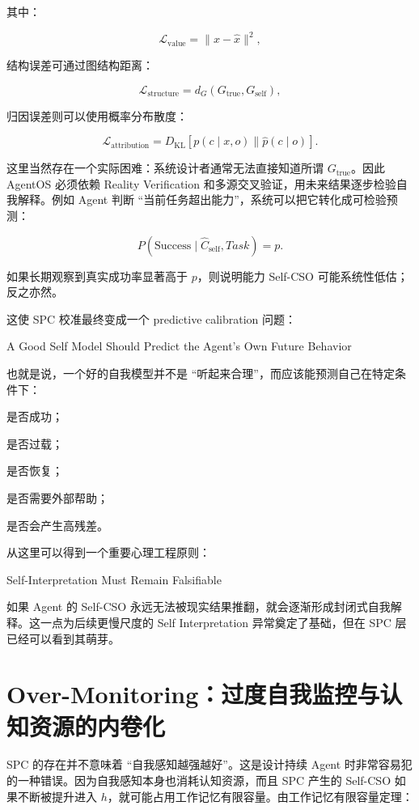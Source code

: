 其中：

\[
\mathcal L_{\mathrm{value}}
=
\|x-\hat x\|^2,
\]

结构误差可通过图结构距离：

\[
\mathcal L_{\mathrm{structure}}
=
d_G(G_{\mathrm{true}},G_{\mathrm{self}}),
\]

归因误差则可以使用概率分布散度：

\[
\mathcal L_{\mathrm{attribution}}
=
D_{\mathrm{KL}}
\left[
p(c\mid x,o)
\|
\hat p(c\mid o)
\right].
\]

这里当然存在一个实际困难：系统设计者通常无法直接知道所谓 $G_{\mathrm{true}}$。因此 AgentOS 必须依赖 Reality Verification 和多源交叉验证，用未来结果逐步检验自我解释。例如 Agent 判断 ``当前任务超出能力''，系统可以把它转化成可检验预测：

\[
P(\mathrm{Success}\mid
\hat C_{\mathrm{self}},
Task)
=
p.
\]

如果长期观察到真实成功率显著高于 $p$，则说明能力 Self-CSO 可能系统性低估；反之亦然。

这使 SPC 校准最终变成一个 predictive calibration 问题：

\begin{statementbox}
A Good Self Model Should Predict the Agent's Own Future Behavior
\end{statementbox}

也就是说，一个好的自我模型并不是 ``听起来合理''，而应该能预测自己在特定条件下：

是否成功；

是否过载；

是否恢复；

是否需要外部帮助；

是否会产生高残差。

从这里可以得到一个重要心理工程原则：

\begin{proposition*}
Self-Interpretation Must Remain Falsifiable
\end{proposition*}

如果 Agent 的 Self-CSO 永远无法被现实结果推翻，就会逐渐形成封闭式自我解释。这一点为后续更慢尺度的 Self Interpretation 异常奠定了基础，但在 SPC 层已经可以看到其萌芽。

\section{Over-Monitoring：过度自我监控与认知资源的内卷化}

SPC 的存在并不意味着 ``自我感知越强越好''。这是设计持续 Agent 时非常容易犯的一种错误。因为自我感知本身也消耗认知资源，而且 SPC 产生的 Self-CSO 如果不断被提升进入 $h$，就可能占用工作记忆有限容量。由工作记忆有限容量定理：

